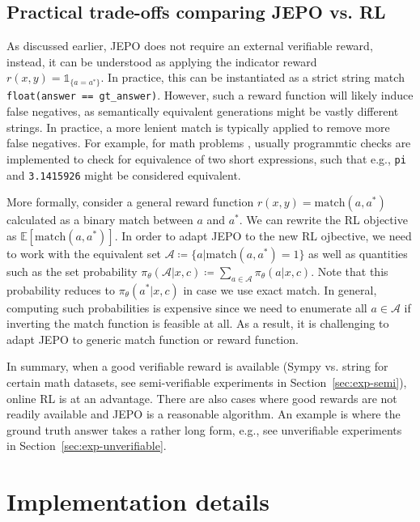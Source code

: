 \documentclass{article}
\theoremstyle{definition}
\begin{document}
\subsection{Practical trade-offs comparing JEPO vs. RL}

As discussed earlier, JEPO does not require an external verifiable reward, instead, it can be understood as applying the indicator reward $r(x,y)=\mathds{1}_{\{a=a^\ast\}}$. In practice, this can be instantiated as a strict string match \verb|float(answer == gt_answer)|. However, such a reward function will likely induce false negatives, as semantically equivalent generations might be vastly different strings. In practice, a more lenient match is typically applied to  remove more false negatives. For example, for math problems \citep{hendrycks2021measuring,yue2024harp}, usually programmtic checks are implemented to check for equivalence of two short expressions, such that e.g., \verb|pi|  and \verb|3.1415926| might be considered equivalent.


More formally, consider a general reward function $r(x,y)=\text{match}(a,a^*)$ calculated as a binary match between $a$ and $a^*$. We can rewrite the RL objective as $\mathbb{E}[\text{match}(a,a^*)]$. In order to adapt JEPO to the new RL ojbective, we need to work  with the equivalent set $\mathcal{A}\coloneqq \{a|\text{match}(a,a^*)=1\}$ as well as  quantities such as the set probability  $\pi_\theta(\mathcal{A}|x,c)\coloneqq\sum_{a\in \mathcal{A}} \pi_\theta(a|x,c)$. Note that this probability 
 reduces to $\pi_\theta(a^*|x,c)$ in case we use exact match. In general, computing such probabilities is expensive since we need to enumerate all $a\in\mathcal{A}$ if inverting the match function is feasible at all. As a result, it is challenging to adapt JEPO to generic match function or reward function.

In summary, when a good verifiable reward is available (Sympy vs. string for certain math datasets, see semi-verifiable experiments in Section~\ref{sec:exp-semi}), online RL is at an advantage. There are also cases where good rewards are not readily available and JEPO is a reasonable algorithm. An example is where the ground truth answer takes a rather long form, e.g., see unverifiable experiments in Section~\ref{sec:exp-unverifiable}.


\section{Implementation details}\label{sec:implement}
\end{document}
